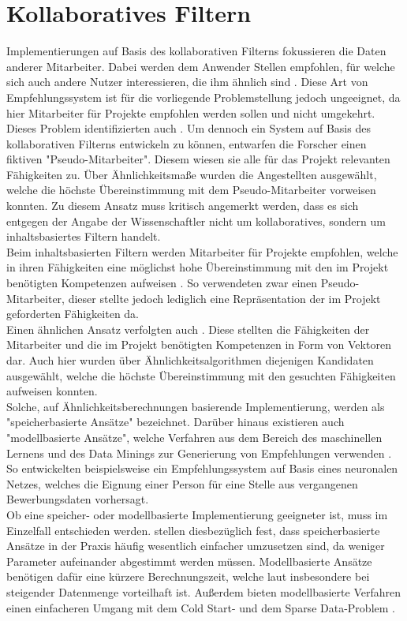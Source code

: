 \section{Kollaboratives Filtern}
\label{ch:empfehlungssysteme:cf}
Implementierungen auf Basis des kollaborativen Filterns fokussieren die Daten anderer Mitarbeiter. Dabei werden dem Anwender Stellen empfohlen, für welche sich auch andere Nutzer interessieren, die ihm ähnlich sind \cite[S. 3]{jobMatcher:2020}. Diese Art von Empfehlungssystem ist für die vorliegende Problemstellung jedoch ungeeignet, da hier Mitarbeiter für Projekte empfohlen werden sollen und nicht umgekehrt. Dieses Problem identifizierten auch \textcite[S. 2]{mitre:2014}. Um dennoch ein System auf Basis des kollaborativen Filterns entwickeln zu können, entwarfen die Forscher einen fiktiven "Pseudo-Mitarbeiter". Diesem wiesen sie alle für das Projekt relevanten Fähigkeiten zu. Über Ähnlichkeitsmaße wurden die Angestellten ausgewählt, welche die höchste Übereinstimmung mit dem Pseudo-Mitarbeiter vorweisen konnten. Zu diesem Ansatz muss kritisch angemerkt werden, dass es sich entgegen der Angabe der Wissenschaftler nicht um kollaboratives, sondern um inhaltsbasiertes Filtern handelt.\\
Beim inhaltsbasierten Filtern werden Mitarbeiter für Projekte empfohlen, welche in ihren Fähigkeiten eine möglichst hohe Übereinstimmung mit den im Projekt benötigten Kompetenzen aufweisen \cite[S. 139]{recommenderSystems:2016}. So verwendeten \textcite[S. 2]{mitre:2014} zwar einen Pseudo-Mitarbeiter, dieser stellte jedoch lediglich eine Repräsentation der im Projekt geforderten Fähigkeiten da.\\
Einen ähnlichen Ansatz verfolgten auch \textcite[S. 6ff.]{buildingVectorRepresentations:2020}. Diese stellten die Fähigkeiten der Mitarbeiter und die im Projekt benötigten Kompetenzen in Form von Vektoren dar. Auch hier wurden über Ähnlichkeitsalgorithmen diejenigen Kandidaten ausgewählt, welche die höchste Übereinstimmung mit den gesuchten Fähigkeiten aufweisen konnten.\\
Solche, auf Ähnlichkeitsberechnungen basierende Implementierung, werden als "speicherbasierte Ansätze" bezeichnet. Darüber hinaus existieren auch "modellbasierte Ansätze", welche Verfahren aus dem Bereich des maschinellen Lernens und des Data Minings zur Generierung von Empfehlungen verwenden \cite[S. 9]{recommenderSystems:2016}. So entwickelten beispielsweise \textcite[S. 5ff.]{personJobFit:2018} ein Empfehlungssystem auf Basis eines neuronalen Netzes, welches die Eignung einer Person für eine Stelle aus vergangenen Bewerbungsdaten vorhersagt.\\
Ob eine speicher- oder modellbasierte Implementierung geeigneter ist, muss im Einzelfall entschieden werden. \textcite[S. 4]{peerToPeer:2008} stellen diesbezüglich fest, dass speicherbasierte Ansätze in der Praxis häufig wesentlich einfacher umzusetzen sind, da weniger Parameter aufeinander abgestimmt werden müssen. Modellbasierte Ansätze benötigen dafür eine kürzere Berechnungszeit, welche laut \textcite[S. 2]{weightedSimilarity:2015} insbesondere bei steigender Datenmenge vorteilhaft ist. Außerdem bieten modellbasierte Verfahren einen einfacheren Umgang mit dem Cold Start- und dem Sparse Data-Problem \cite[S. 4]{peerToPeer:2008}.

